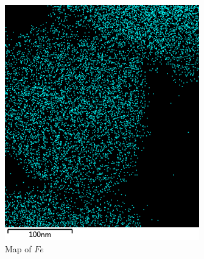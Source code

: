 \documentclass[12pt,a4paper]{article}
\begin{document}
\begin{figure}
  \begin{subfigure}[b]{0.35\textwidth}
    \includegraphics[width=\textwidth]{Data/Fe Map.png}
    \caption{Map of $Fe$}
    \label{fig:fe_map}
  \end{subfigure}
  \begin{subfigure}[b]{0.35\textwidth}

\end{subfigure}
\end{figure}
\end{document}
